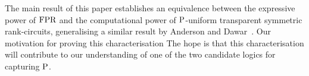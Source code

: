 \documentclass[../paper.tex]{subfiles}
\begin{document}
The main result of this paper establishes an equivalence between the expressive
power of $\text{\upshape FPR}$ and the computational power of $\mathrm{P}$-uniform transparent
symmetric rank-circuits, generalising a similar result by Anderson and
Dawar~\cite{AndersonD17}. Our motivation for proving this characterisation  The hope is that this characterisation will
contribute to our understanding of one of the two candidate logics for capturing
$\mathrm{P}$.


\end{document}
